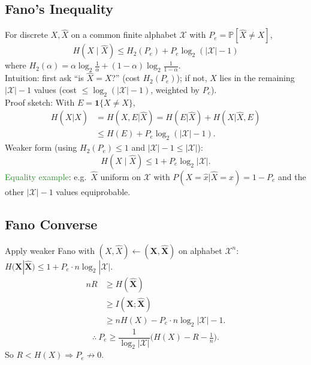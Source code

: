 \subsection{Fano's Inequality}
For discrete $X,\hat X$ on a common finite alphabet $\mathcal{X}$ with
$P_e=\mathbb{P}[\hat X\neq X]$,
\[\boxed{\;H(X\mid\hat X)\le H_2(P_e)+P_e\log_2(|\mathcal{X}|-1)\;}\]
where $H_2(\alpha)=\alpha\log_2\tfrac1\alpha+(1-\alpha)\log_2\tfrac{1}{1-\alpha}$.\\
\textcolor{Bittersweet}{Intuition}: first ask ``is $\hat X=X$?'' (cost $H_2(P_e)$);
if not, $X$ lies in the remaining $|\mathcal X|-1$ values (cost $\le\log_2(|\mathcal X|-1)$, weighted by $P_e$).\\
\textcolor{Bittersweet}{Proof sketch}: With $E=\mathbf 1\{X\neq\hat X\}$,
\begin{align*}
  H(X|\hat X) &= H(X,E|\hat X) = H(E|\hat X)+H(X|\hat X,E)\\
              &\le H(E)+P_e\log_2(|\mathcal X|-1).
\end{align*}
\textcolor{Bittersweet}{Weaker form} (using $H_2(P_e)\le 1$ and $|\mathcal X|-1\le|\mathcal X|$):
\[H(X\mid\hat X)\le 1+P_e\log_2|\mathcal{X}|.\]
\textcolor{ForestGreen}{Equality example}: e.g.\ $\hat X$ uniform on $\mathcal X$
with $P(X=\hat x|\hat X=\hat x)=1-P_e$ and the other $|\mathcal X|-1$ values equiprobable.

\subsection{Fano Converse}
Apply weaker Fano with $(X,\hat X)\leftarrow(\mathbf X,\hat{\mathbf X})$ on alphabet
$\mathcal X^n$: $H(\mathbf X|\hat{\mathbf X})\le 1+P_e\cdot n\log_2|\mathcal X|$.
\begin{align*}
nR &\ge H(\hat{\mathbf X})\\
   &\ge I(\mathbf X;\hat{\mathbf X})\\
   &\ge nH(X)-P_e\cdot n\log_2|\mathcal X|-1.
\end{align*}
\[\therefore\ P_e\ge\frac{1}{\log_2|\mathcal X|}\Big(H(X)-R-\tfrac{1}{n}\Big).\]
So $R<H(X)\Rightarrow P_e\not\to 0$.
